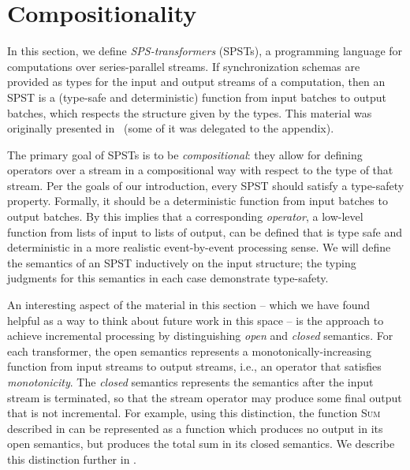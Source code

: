 \chapter{Compositionality}
\label{cha:composition}

In this section, we define \emph{SPS-transformers} (SPSTs), a programming language for computations over series-parallel streams.
If synchronization schemas are provided as types for the input and output streams of a computation,
then an SPST is a (type-safe and deterministic) function from input batches to output batches, which respects the structure given by the types. This material was originally presented in~ (some of it was delegated to the appendix).

The primary goal of SPSTs is to be \emph{compositional}: they allow for defining operators over a stream in a compositional way with respect to the type of that stream.
Per the goals of our introduction, every SPST should satisfy a type-safety property.
Formally, it should be a deterministic function from input batches to output batches.
By  this implies that a corresponding \emph{operator}, a low-level function from lists of input to lists of output, can be defined that is type safe and deterministic
in a more realistic event-by-event processing sense.
We will define the semantics of an SPST inductively on the input structure; the typing judgments for this semantics in each case demonstrate type-safety.

An interesting aspect of the material in this section -- which we have found helpful as a way to think about future work in this space -- is the approach to achieve incremental processing by distinguishing \emph{open} and \emph{closed} semantics. For each transformer, the open semantics represents a monotonically-increasing function from input streams to output streams, i.e., an operator that satisfies \emph{monotonicity}. The \emph{closed} semantics represents the semantics after the input stream is terminated, so that the stream operator may produce some final output that is not incremental.
For example, using this distinction, the function \textsc{Sum} described in  can be represented as a function which produces no output in its open semantics, but produces the total sum in its closed semantics.
We describe this distinction further in .

